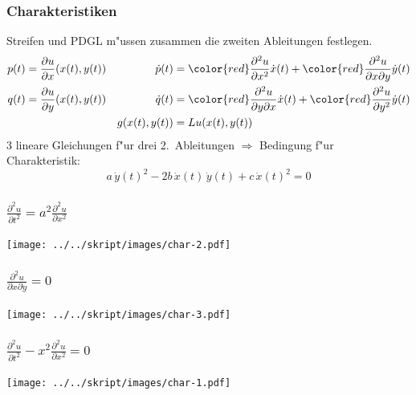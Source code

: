 \begin{frame}
\frametitle{Charakteristiken}

Streifen und PDGL m"ussen zusammen die zweiten Ableitungen festlegen.
\begin{align*}
p(t)&=\frac{\partial u}{\partial x}(x(t), y(t))
&
\dot p(t)
&={\color{red} \frac{\partial^2 u}{\partial x^2}}\dot x(t)
+
{\color{red}\frac{\partial^2u}{\partial x\partial y}}\dot y(t)
\\
q(t)&=\frac{\partial u}{\partial y}(x(t), y(t))
&
\dot q(t)
&=
{\color{red}\frac{\partial^2 u}{\partial y\partial x}}\dot x(t)
+
{\color{red}\frac{\partial^2u}{\partial y^2}}\dot y(t)
\\
&&g(x(t),y(t))&=Lu (x(t),y(t))
\end{align*}
3 lineare Gleichungen f"ur drei 2.~Ableitungen
$\Rightarrow$
Bedingung f"ur Charakteristik:
\[
a\,\dot y(t)^2-2b\,\dot x(t)\,\dot y(t)+c\,\dot x(t)^2=0
\]
\end{frame}

\begin{frame}
\frametitle{$\displaystyle \frac{\partial^2u}{\partial t^2}=a^2\frac{\partial^2u}{\partial x^2}$}
\pause
\begin{center}
\texttt{[image: ../../skript/images/char-2.pdf]}
\end{center}
\end{frame}

\begin{frame}
\frametitle{$\displaystyle \frac{\partial^2 u}{\partial x\partial y}=0$}
\pause
\begin{center}
\texttt{[image: ../../skript/images/char-3.pdf]}
\end{center}
\end{frame}

\begin{frame}
\frametitle{$\displaystyle \frac{\partial^2u}{\partial t^2}-x^2\frac{\partial^2 u}{\partial x^2}=0$}
\pause
\begin{center}
\texttt{[image: ../../skript/images/char-1.pdf]}
\end{center}
\end{frame}


